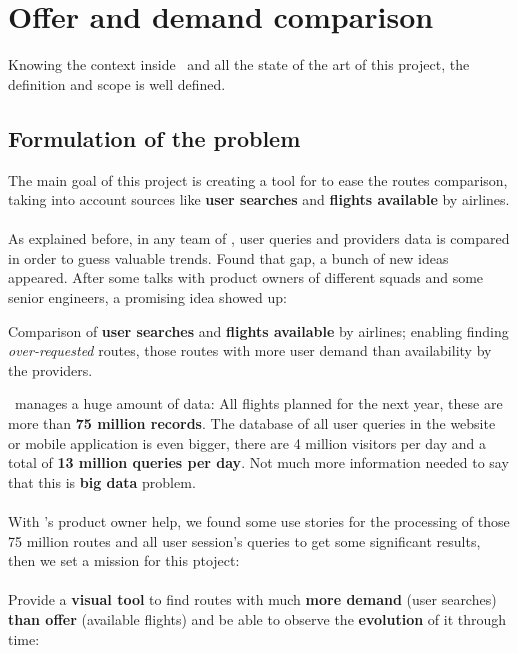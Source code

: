
\chapter{Offer and demand comparison}

\label{chapter03}

Knowing the context inside \company\ and all the state of the art of this project, the definition and scope is well defined.


\section{Formulation of the problem} \label{problem}

The main goal of this project is creating a tool for \textit{\company} to ease the routes comparison, taking into account sources like \textbf{user searches} and \textbf{flights available} by airlines.
\\\\
As explained before, in any team of \company, user queries and providers data is compared in order to guess valuable trends. Found that gap, a bunch of new ideas appeared. After some talks with product owners of different squads and some senior engineers, a promising idea showed up:

\begin{displayquote}
Comparison of \textbf{user searches} and \textbf{flights available} by airlines; enabling finding \textit{over-requested} routes, those routes with more user demand than availability by the providers.
\end{displayquote}

\squad\ manages a huge amount of data: All flights planned for the next year, these are more than \textbf{75 million records}. The database of all user queries in the website or mobile application is even bigger, there are 4 million visitors per day and a total of \textbf{13 million queries per day}. Not much more information needed to say that this is \textbf{big data} problem.
\\\\
With \squad's product owner help, we found some use stories for the processing of those 75 million routes and all user session's queries to get some significant results, then we set a mission for this ptoject:
\\\\
Provide a \textbf{visual tool} to find routes with much \textbf{more demand} (user searches) \textbf{than offer} (available flights) and be able to observe the \textbf{evolution} of it through time:


